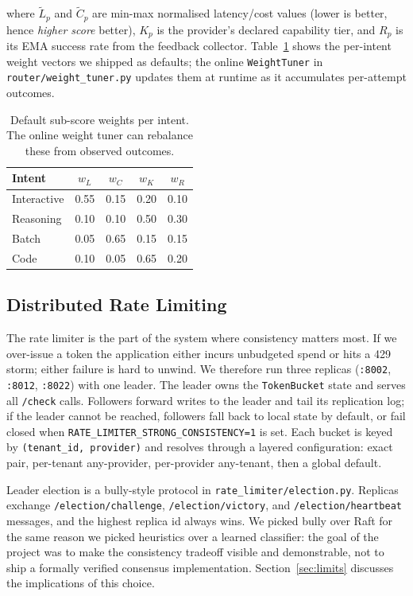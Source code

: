 \documentclass[conference,letterpaper]{IEEEtran}
\begin{document}
where $\tilde{L}_p$ and $\tilde{C}_p$ are min-max normalised
latency/cost values (lower is better, hence \emph{higher score}
better), $K_p$ is the provider's declared capability tier, and
$R_p$ is its EMA success rate from the feedback collector.
Table~\ref{tab:weights} shows the per-intent weight vectors we
shipped as defaults; the online \texttt{WeightTuner} in
\texttt{router/weight\_tuner.py} updates them at runtime as it
accumulates per-attempt outcomes.

\begin{table}[!t]
\caption{Default sub-score weights per intent. The online weight
tuner can rebalance these from observed outcomes.}
\label{tab:weights}
\centering
\renewcommand{\arraystretch}{1.1}
\begin{tabular}{lcccc}
\toprule
Intent       & $w_L$ & $w_C$ & $w_K$ & $w_R$ \\
\midrule
Interactive  & 0.55  & 0.15  & 0.20  & 0.10 \\
Reasoning    & 0.10  & 0.10  & 0.50  & 0.30 \\
Batch        & 0.05  & 0.65  & 0.15  & 0.15 \\
Code         & 0.10  & 0.05  & 0.65  & 0.20 \\
\bottomrule
\end{tabular}
\end{table}

\subsection{Distributed Rate Limiting}
The rate limiter is the part of the system where consistency matters
most. If we over-issue a token the application either incurs
unbudgeted spend or hits a 429 storm; either failure is hard to
unwind. We therefore run three replicas (\texttt{:8002},
\texttt{:8012}, \texttt{:8022}) with one leader. The leader owns the \texttt{TokenBucket} state and serves all
\texttt{/check} calls. Followers forward writes to the leader and
tail its replication log; if the leader cannot be reached, followers
fall back to local state by default, or fail closed when
\texttt{RATE\_LIMITER\_STRONG\_CONSISTENCY=1} is set. Each bucket is
keyed by \texttt{(tenant\_id, provider)} and resolves through a
layered configuration: exact pair, per-tenant any-provider,
per-provider any-tenant, then a global default.

Leader election is a bully-style protocol in
\texttt{rate\_limiter/election.py}. Replicas exchange
\texttt{/election/challenge}, \texttt{/election/victory}, and
\texttt{/election/heartbeat} messages, and the highest replica id
always wins. We picked bully over Raft for the same reason we picked
heuristics over a learned classifier: the goal of the project was to
make the consistency tradeoff visible and demonstrable, not to ship
a formally verified consensus implementation. Section~\ref{sec:limits}
discusses the implications of this choice.
\end{document}
